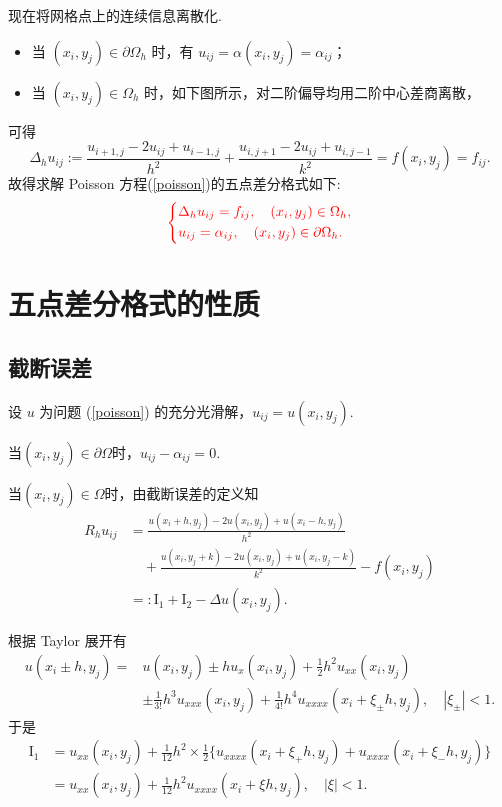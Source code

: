 现在将网格点上的连续信息离散化.
\begin{itemize}
    \item 当 $(x_i, y_j) \in \partial\Omega_h$ 时，有 $u_{ij} = \alpha(x_i, y_j) = \alpha_{ij}$；
    \item 当 $(x_i, y_j) \in \Omega_h$ 时，如下图所示，对二阶偏导均用二阶中心差商离散，
\end{itemize}


可得
\begin{equation*}
    \Delta_h u_{ij} := \frac{u_{i+1,j} - 2u_{ij} + u_{i-1,j}}{h^2} + \frac{u_{i,j+1} - 2u_{ij} + u_{i,j-1}}{k^2} = f(x_i, y_j) = f_{ij}.
\end{equation*}
故得求解 Poisson 方程(\ref{poisson})的五点差分格式如下:
\begin{equation}\label{five-point}
    {\color{red} \left\{\begin{aligned}
        &\Delta_h u_{ij} = f_{ij}, \quad (x_i, y_j) \in \Omega_h, \\
        &u_{ij} = \alpha_{ij}, \quad (x_i, y_j) \in \partial\Omega_h.
    \end{aligned}\right.}
\end{equation}



\section{五点差分格式的性质}


\subsection{截断误差}
设 $u$ 为问题 (\ref{poisson}) 的充分光滑解，$u_{ij}=u(x_i,y_j)$.\par
当$(x_i,y_j)\in\partial\Omega$时，$u_{ij}-\alpha_{ij}=0$.\par
当$(x_i,y_j)\in\Omega$时，由截断误差的定义知
\begin{align*}
    R_h u_{ij} &= \frac{u(x_i + h, y_j) - 2u(x_i, y_j) + u(x_i - h, y_j)}{h^2} \\
    &\quad + \frac{u(x_i, y_j + k) - 2u(x_i, y_j) + u(x_i, y_j - k)}{k^2} - f(x_i, y_j) \\
    &=: \mathrm{I}_1 + \mathrm{I}_2 - \Delta u(x_i, y_j).
\end{align*}

根据 Taylor 展开有
\begin{align*}
    u(x_i \pm h, y_j) =& u(x_i, y_j) \pm h u_x(x_i, y_j) + \frac{1}{2}h^2 u_{xx}(x_i, y_j) \\
    &\pm \frac{1}{3!}h^3 u_{xxx}(x_i, y_j) + \frac{1}{4!}h^4 u_{xxxx}(x_i + \xi_{\pm} h, y_j), \quad |\xi_{\pm}| < 1.
\end{align*}
于是
\begin{align*}
    \mathrm{I}_1 &= u_{xx}(x_i, y_j) + \frac{1}{12}h^2 \times \frac{1}{2}\{u_{xxxx}(x_i + \xi_+ h, y_j) + u_{xxxx}(x_i + \xi_- h, y_j)\} \\
    &= u_{xx}(x_i, y_j) + \frac{1}{12}h^2 u_{xxxx}(x_i + \xi h, y_j), \quad |\xi| < 1.
\end{align*}

